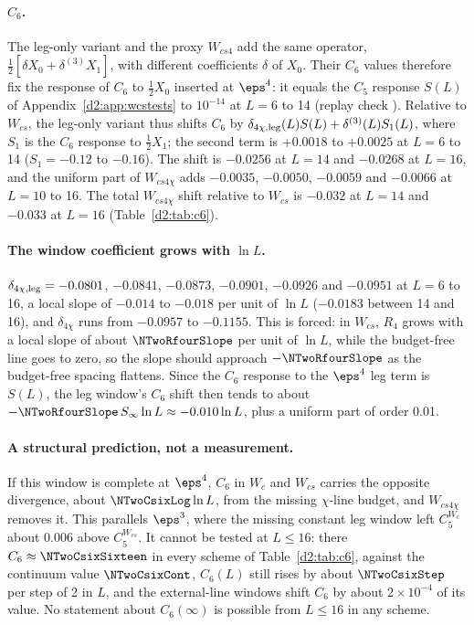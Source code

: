 \paragraph{$C_6$.} The leg-only variant and the proxy $W_{cs4}$ add the same operator, $\frac12[\delta X_0+\delta^{(3)}X_1]$,
with different coefficients $\delta$ of $X_0$. Their $C_6$ values therefore fix the response of $C_6$ to $\frac12X_0$
inserted at $\eps^4$: it equals the $C_5$ response $S(L)$ of Appendix~\ref{d2:app:wcstests} to $10^{-14}$ at $L=6$ to 14
(replay check ). Relative to $W_{cs}$, the leg-only variant thus shifts $C_6$ by
$\delta_{4\chi,{\rm leg}}(L)S(L)+\delta^{(3)}(L)S_1(L)$, where $S_1$ is the $C_6$ response to $\frac12X_1$; the second term is
$+0.0018$ to $+0.0025$ at $L=6$ to 14 ($S_1=-0.12$ to $-0.16$). The shift is $-0.0256$ at $L=14$ and $-0.0268$ at $L=16$,
and the uniform part of $W_{cs4\chi}$ adds $-0.0035$, $-0.0050$, $-0.0059$ and $-0.0066$ at $L=10$ to 16. The total
$W_{cs4\chi}$ shift relative to $W_{cs}$ is $-0.032$ at $L=14$ and $-0.033$ at $L=16$ (Table~\ref{d2:tab:c6}).

\paragraph{The window coefficient grows with $\ln L$.} $\delta_{4\chi,{\rm leg}}=-0.0801$, $-0.0841$, $-0.0873$, $-0.0901$, $-0.0926$ and $-0.0951$ at
$L=6$ to 16, a local slope of $-0.014$ to $-0.018$ per unit of $\ln L$ ($-0.0183$ between 14 and 16), and $\delta_{4\chi}$ runs
from $-0.0957$ to $-0.1155$. This is forced: in $W_{cs}$, $R_4$ grows with a local slope of about $\NTwoRfourSlope$ per unit of $\ln L$, while the
budget-free line goes to zero, so the slope should approach $-\NTwoRfourSlope$ as the budget-free spacing flattens. Since
the $C_6$ response to the $\eps^4$ leg term is $S(L)$, the leg window's $C_6$ shift then tends to about
$-\NTwoRfourSlope\,S_\infty\ln L\approx-0.010\ln L$, plus a uniform part of order 0.01.

\paragraph{A structural prediction, not a measurement.} If this window is complete at $\eps^4$, $C_6$ in $W_c$ and $W_{cs}$
carries the opposite divergence, about $\NTwoCsixLog\ln L$, from the missing $\chi$-line budget, and $W_{cs4\chi}$ removes it.
This parallels $\eps^3$, where the missing constant leg window left $C_5^{W_c}$ about $0.006$ above $C_5^{W_{cs}}$. It cannot be
tested at $L\le16$: there $C_6\approx\NTwoCsixSixteen$ in every scheme of Table~\ref{d2:tab:c6}, against the continuum value
$\NTwoCsixCont$, $C_6(L)$ still rises by about $\NTwoCsixStep$ per step of 2 in $L$, and the external-line windows shift $C_6$
by about $2\times10^{-4}$ of its value. No statement
about $C_6(\infty)$ is possible from $L\le16$ in any scheme.

